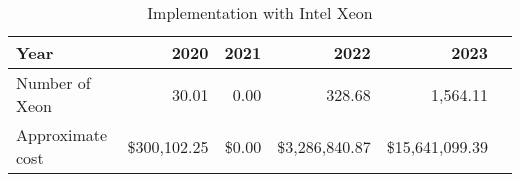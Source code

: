 \tiny \begin{longtable} { |p{}  |r  |r  |r  |r  |r |} 
\caption{Implementation with Intel Xeon \label{tab:Xeon}}\\ 
\hline 
\textbf{Year}&\textbf{2020}&\textbf{2021}&\textbf{2022}&\textbf{2023} \\ \hline
{Number of Xeon}&{30.01}&{0.00}&{328.68}&{1,564.11} \\ \hline
{Approximate cost}&{\$300,102.25}&{\$0.00}&{\$3,286,840.87}&{\$15,641,099.39} \\ \hline
\end{longtable} \normalsize
